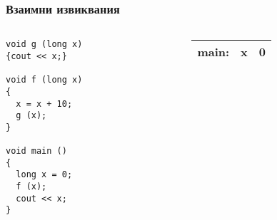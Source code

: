 \documentclass{beamer}
\begin{document}
\begin{frame}[fragile]
\frametitle{Взаимни извиквания}

\begin{columns}[t]
  \begin{column}{0.8\textwidth}
\begin{lstlisting}
void g (long x)
{cout << x;}

void f (long x)
{
  x = x + 10;
  g (x);
}

void main ()
{
  long x = 0;
  f (x);
  cout << x;
}

\end{lstlisting}
  \end{column}
  \begin{column}{0.2\textwidth}

    \begin{tabular}{c|c|c|}
    main: & x & 0 \\\hline

    \end{tabular}



  \end{column}
\end{columns}


\end{frame}
\end{document}
